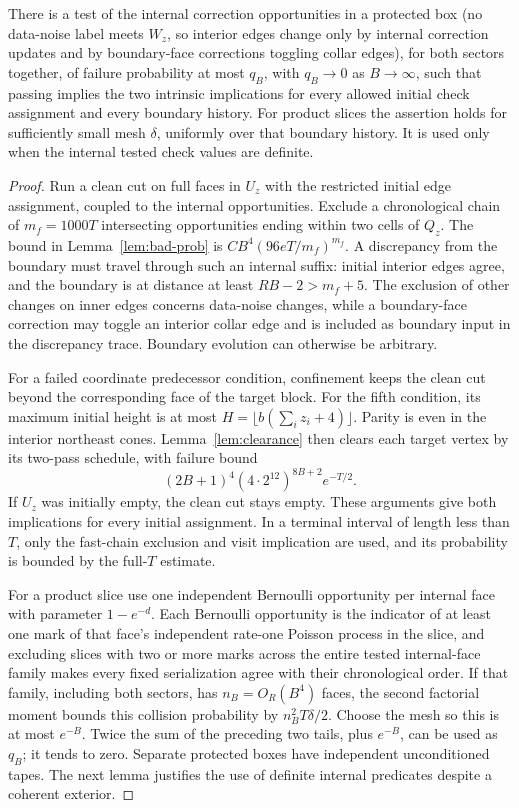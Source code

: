 \begin{lemma}\label{lem:quantum-clock}
There is a test of the internal correction opportunities in a
protected box (no data-noise label meets \(W_z\), so interior edges change only by internal correction updates and by
boundary-face corrections toggling collar edges), for both sectors together, of failure probability
at most \(q_B\), with \(q_B\to0\) as \(B\to\infty\), such that
passing implies the two intrinsic implications for every allowed
initial check assignment and every boundary history.
For product slices the assertion holds for sufficiently small
mesh \(\delta\), uniformly over that boundary history.
It is used only when the internal tested check values are definite.
\end{lemma}
\begin{proof}
Run a clean cut on full faces in \(U_z\) with the restricted initial
edge assignment, coupled to the internal opportunities.
Exclude a chronological chain of \(m_f=1000T\) intersecting
opportunities ending within two cells of \(Q_z\).
The bound in Lemma~\ref{lem:bad-prob} is
\(CB^4(96eT/m_f)^{m_f}\).
A discrepancy from the boundary must travel through such an
internal suffix: initial interior edges agree, and the boundary
is at distance at least \(RB-2>m_f+5\).
The exclusion of other changes on inner edges concerns data-noise
changes, while a boundary-face correction may toggle an interior
collar edge and is included as boundary input in the discrepancy
trace.
Boundary evolution can otherwise be arbitrary.

For a failed coordinate predecessor condition, confinement keeps
the clean cut beyond the corresponding face of the target block.
For the fifth condition, its maximum initial height is at most
\(H=\lfloor b(\sum_i z_i+4)\rfloor\).
Parity is even in the interior northeast cones.
Lemma~\ref{lem:clearance} then clears each target vertex by its
two-pass schedule, with failure bound
\[
 (2B+1)^4(4\cdot2^{12})^{8B+2}e^{-T/2}.
\]
If \(U_z\) was initially empty, the clean cut stays empty.
These arguments give both implications for every initial
assignment. In a terminal interval of length less than \(T\),
only the fast-chain exclusion and visit implication are used,
and its probability is bounded by the full-\(T\) estimate.

For a product slice use one independent Bernoulli opportunity
per internal face with parameter \(1-e^{-d}\).
Each Bernoulli opportunity is the indicator of at least one mark
of that face's independent rate-one Poisson process in the slice,
and excluding slices with two or more marks across the entire
tested internal-face family makes every fixed serialization agree
with their chronological order.
If that family, including both sectors, has \(n_B=O_R(B^4)\)
faces, the second factorial moment bounds this collision
probability by \(n_B^2T\delta/2\).
Choose the mesh so this is at most \(e^{-B}\).
Twice the sum of the preceding two tails, plus \(e^{-B}\),
can be used as \(q_B\); it tends to zero.
Separate protected boxes have independent unconditioned tapes.
The next lemma justifies the use of definite internal predicates
despite a coherent exterior.
\end{proof}


